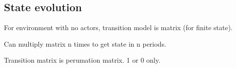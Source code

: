 
\subsection{State evolution}

For environment with no actors, transition model is matrix (for finite state).

Can multiply matrix n times to get state in n periods.


Transition matrix is perumation matrix. 1 or 0 only.


